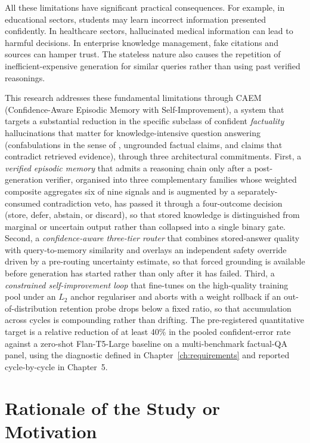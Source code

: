 All these limitations have significant practical consequences. For example, in educational sectors, students may learn incorrect information presented confidently. In healthcare sectors, hallucinated medical information can lead to harmful decisions. In enterprise knowledge management, fake citations and sources can hamper trust. The stateless nature also causes the repetition of inefficient-expensive generation for similar queries rather than using past verified reasonings.

This research addresses these fundamental limitations through CAEM (Confidence-Aware Episodic Memory with Self-Improvement), a system that targets a substantial reduction in the specific subclass of confident \textit{factuality} hallucinations that matter for knowledge-intensive question answering (confabulations in the sense of \citet{farquhar2024semantic}, ungrounded factual claims, and claims that contradict retrieved evidence), through three architectural commitments. First, a \textit{verified episodic memory} that admits a reasoning chain only after a post-generation verifier, organised into three complementary families whose weighted composite aggregates six of nine signals and is augmented by a separately-consumed contradiction veto, has passed it through a four-outcome decision (store, defer, abstain, or discard), so that stored knowledge is distinguished from marginal or uncertain output rather than collapsed into a single binary gate. Second, a \textit{confidence-aware three-tier router} that combines stored-answer quality with query-to-memory similarity and overlays an independent safety override driven by a pre-routing uncertainty estimate, so that forced grounding is available before generation has started rather than only after it has failed. Third, a \textit{constrained self-improvement loop} that fine-tunes on the high-quality training pool under an $L_2$ anchor regulariser and aborts with a weight rollback if an out-of-distribution retention probe drops below a fixed ratio, so that accumulation across cycles is compounding rather than drifting. The pre-registered quantitative target is a relative reduction of at least 40\% in the pooled confident-error rate against a zero-shot Flan-T5-Large baseline on a multi-benchmark factual-QA panel, using the diagnostic defined in Chapter~\ref{ch:requirements} and reported cycle-by-cycle in Chapter~5.

\section{Rationale of the Study or Motivation}

